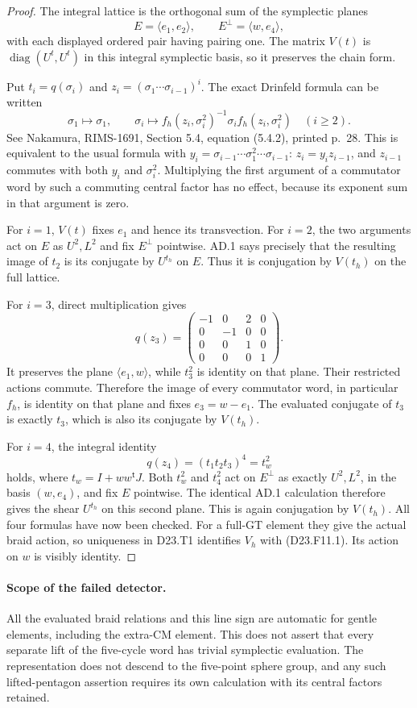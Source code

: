\begin{proof}
The integral lattice is the orthogonal sum of the symplectic
planes
\[
 E=\langle e_1,e_2\rangle,\qquad
 E^\perp=\langle w,e_4\rangle,
\]
with each displayed ordered pair having pairing one.  The
matrix $V(t)$ is $\operatorname{diag}(U^t,U^t)$ in this
integral symplectic basis, so it preserves the chain form.

Put $t_i=q(\sigma_i)$ and
$z_i=(\sigma_1\cdots\sigma_{i-1})^i$.
The exact Drinfeld formula can be written
\[
 \sigma_1\mapsto\sigma_1,\qquad
 \sigma_i\mapsto f_h(z_i,\sigma_i^2)^{-1}
                   \sigma_i f_h(z_i,\sigma_i^2)\quad(i\geq2).
 \tag{D23.F11.2}
\]
See Nakamura, RIMS-1691, Section 5.4, equation (5.4.2),
printed p.~28.  This is equivalent to the usual formula
with $y_i=\sigma_{i-1}\cdots\sigma_1^2\cdots\sigma_{i-1}$:
$z_i=y_i z_{i-1}$, and $z_{i-1}$ commutes with both $y_i$
and $\sigma_i^2$.  Multiplying the first argument of a
commutator word by such a commuting central factor has no
effect, because its exponent sum in that argument is zero.

For $i=1$, $V(t)$ fixes $e_1$ and hence its transvection.
For $i=2$, the two arguments act on $E$ as $U^2,L^2$ and
fix $E^\perp$ pointwise.  AD.1 says precisely that the
resulting image of $t_2$ is its conjugate by $U^{t_h}$ on
$E$.  Thus it is conjugation by $V(t_h)$ on the full lattice.

For $i=3$, direct multiplication gives
\[
 q(z_3)=
 \begin{pmatrix}-1&0&2&0\\0&-1&0&0\\0&0&1&0\\0&0&0&1\end{pmatrix}.
\]
It preserves the plane $\langle e_1,w\rangle$, while
$t_3^2$ is identity on that plane.  Their restricted actions
commute.  Therefore the image of every commutator word,
in particular $f_h$, is identity on that plane and fixes
$e_3=w-e_1$.  The evaluated conjugate of $t_3$ is exactly
$t_3$, which is also its conjugate by $V(t_h)$.

For $i=4$, the integral identity
\[
 q(z_4)=(t_1t_2t_3)^4=t_w^2
\]
holds, where $t_w=I+ww^{\mathsf t}J$.
Both $t_w^2$ and $t_4^2$ act on $E^\perp$ as exactly
$U^2,L^2$, in the basis $(w,e_4)$, and fix $E$ pointwise.
The identical AD.1 calculation therefore gives the shear
$U^{t_h}$ on this second plane.  This is again conjugation
by $V(t_h)$.
All four formulas have now been checked.  For a full-GT
element they give the actual braid action, so uniqueness
in D23.T1 identifies $V_h$ with (D23.F11.1).  Its action
on $w$ is visibly identity.
\end{proof}

\paragraph{Scope of the failed detector.}
All the evaluated braid relations and this line sign are
automatic for gentle elements, including the extra-CM
element.  This does not assert that every separate lift
of the five-cycle word has trivial symplectic evaluation.
The representation does not descend to the five-point
sphere group, and any such lifted-pentagon assertion
requires its own calculation with its central factors retained.
